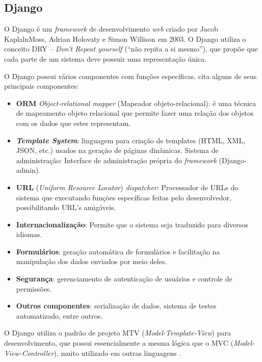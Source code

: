 \documentclass[
	12pt,				%
    oneside,			%
	a4paper,			%
	english,			%
	french,				%
	spanish,			%
	brazil,				%
	]{abntex2}
\begin{document}
\subsection{Django}

O Django é um \textit{framework} de desenvolvimento \textit{web} criado por Jacob KaplalnMoss,
Adrian Holovaty e Simon Willison em 2003. O Django utiliza o conceito DRY –
\textit{Don’t Repeat yourself} (“não repita a si mesmo”), que propõe que cada parte de um
sistema deve possuir uma representação única.

O Django possui vários componentes com funções específicas. 
cita alguns de seus principais componentes:

 \begin{itemize}

	\item \textbf{ORM} \textit{\textit{Object-relational mapper}} (Mapeador objeto-relacional): é
uma técnica de mapeamento objeto relacional que permite fazer uma
relação dos objetos com os dados que estes representam.
	\item \textbf{\textit{Template System}}: linguagem para criação de templates (HTML, XML,
JSON, etc.) usados na geração de páginas dinâmicas.
Sistema de administração: Interface de administração própria do
\textit{framework} (Django-admin).
	\item \textbf{URL} (\textit{Uniform Resource Locator}) \textit{dispatcher}: Processador de URLs
do sistema que executando funções específicas feitas pelo
desenvolvedor, possibilitando URL’s amigáveis.
	\item \textbf{Internacionalização}: Permite que o sistema seja traduzido para
diversos idiomas.
	\item \textbf{Formulários}: geração automática de formulários e facilitação na
manipulação dos dados enviados por meio deles.
	\item \textbf{Segurança}: gerenciamento de autenticação de usuários e controle de
permissões.
	\item \textbf{Outros componentes}: serialização de dados, sistema de testes
automatizado, entre outros.

\end{itemize}

O Django utiliza o padrão de projeto MTV (\textit{Model-Template-View}) para
desenvolvimento, que possui essencialmente a mesma lógica que o MVC (\textit{Model-View-Controller}),
muito utilizado em outras linguagens \cite{neto}.
\end{document}
